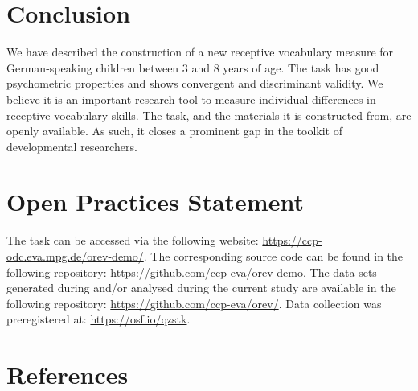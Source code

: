 \documentclass[
  man,floatsintext]{apa6}
\begin{document}
\hypertarget{conclusion}{%
\section{Conclusion}\label{conclusion}}

We have described the construction of a new receptive vocabulary measure for German-speaking children between 3 and 8 years of age. The task has good psychometric properties and shows convergent and discriminant validity. We believe it is an important research tool to measure individual differences in receptive vocabulary skills. The task, and the materials it is constructed from, are openly available. As such, it closes a prominent gap in the toolkit of developmental researchers.

\hypertarget{open-practices-statement}{%
\section{Open Practices Statement}\label{open-practices-statement}}

The task can be accessed via the following website: \url{https://ccp-odc.eva.mpg.de/orev-demo/}. The corresponding source code can be found in the following repository: \url{https://github.com/ccp-eva/orev-demo}. The data sets generated during and/or analysed during the current study are available in the following repository: \url{https://github.com/ccp-eva/orev/}. Data collection was preregistered at: \url{https://osf.io/qzstk}.

\newpage

\hypertarget{references}{%
\section{References}\label{references}}
\end{document}
